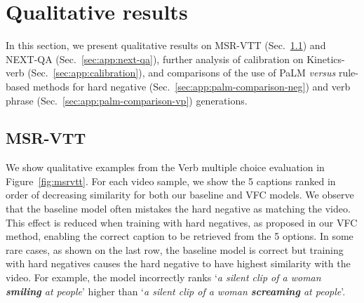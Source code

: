 \begin{table}
    \setlength{\tabcolsep}{6pt}
    \centering
     \vspace{0.2cm}
    \caption{
    \textbf{Calibration strategy.} We report multi-choice accuracy on Verb~\cite{park-etal-2022-exposing} and Kinetics-400 top-1 accuracy. We observe that by combining both calibration steps, we avoid a drop in performance on Kinetics-400, while maintaining a large performance improvement on Verb. For experiments including hard negatives, we note that one hard negative is sampled for each video here.}
    \label{tab:calibration-steps}
\end{table}

\vspace{+1cm}
\section{Qualitative results}\label{sec:app:qualitative}

In this section, we present qualitative results on MSR-VTT (Sec.~\ref{sec:app:msr-vtt}) and NEXT-QA (Sec.~\ref{sec:app:next-qa}), further analysis of calibration on Kinetics-verb (Sec.~\ref{sec:app:calibration}), and comparisons of the use of PaLM \textit{versus} rule-based methods for hard negative (Sec.~\ref{sec:app:palm-comparison-neg}) and verb phrase (Sec.~\ref{sec:app:palm-comparison-vp}) generations.  

\vspace{+0.4cm}

\subsection{MSR-VTT}\label{sec:app:msr-vtt}
We show qualitative examples from the Verb \cite{park-etal-2022-exposing} multiple choice evaluation in Figure~\ref{fig:msrvtt}. For each video sample, we show the 5 captions ranked in order of decreasing similarity for both our baseline and VFC models. We observe that the baseline model often mistakes the hard negative as matching the video. This effect is reduced when training with hard negatives, as proposed in our VFC method, enabling the correct caption to be retrieved from the 5 options. In some rare cases, as shown on the last row, the baseline model is correct but training with hard negatives causes the hard negative to have highest similarity with the video. For example, the model incorrectly ranks `\textit{a silent clip of a woman \textbf{smiling} at people}' higher than `\textit{a silent clip of a woman \textbf{screaming} at people}'.

